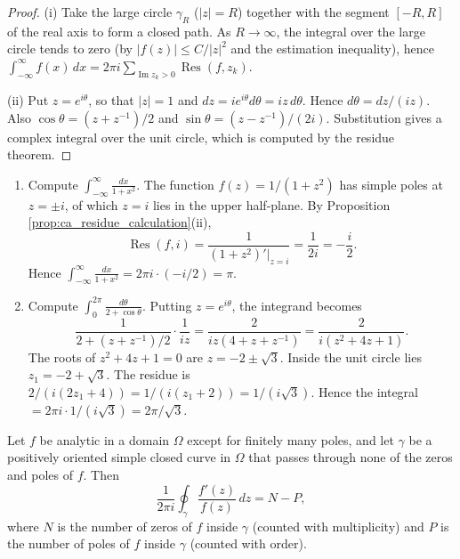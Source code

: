 \begin{proof}
(i) Take the large circle $\gamma_R$ ($|z| = R$) together with the segment $[-R, R]$ of the real axis to form a closed path. As $R \to \infty$, the integral over the large circle tends to zero (by $|f(z)| \le C/|z|^2$ and the estimation inequality), hence $\int_{-\infty}^{\infty} f(x) \, dx = 2\pi i \sum_{\operatorname{Im} z_k > 0} \operatorname{Res}(f, z_k)$.

(ii) Put $z = e^{i\theta}$, so that $|z| = 1$ and $dz = i e^{i\theta} d\theta = iz \, d\theta$. Hence $d\theta = dz/(iz)$. Also $\cos\theta = (z + z^{-1})/2$ and $\sin\theta = (z - z^{-1})/(2i)$. Substitution gives a complex integral over the unit circle, which is computed by the residue theorem.
\end{proof}

\begin{example}\label{ex:ca_residue_real_integral}
\begin{enumerate}[label=(\roman*)]
    \item Compute $\displaystyle\int_{-\infty}^{\infty} \frac{dx}{1 + x^2}$. The function $f(z) = 1/(1 + z^2)$ has simple poles at $z = \pm i$, of which $z = i$ lies in the upper half-plane. By Proposition \ref{prop:ca_residue_calculation}(ii),
    \[
    \operatorname{Res}(f, i) = \frac{1}{(1 + z^2)'|_{z=i}} = \frac{1}{2i} = -\frac{i}{2}.
    \]
    Hence $\int_{-\infty}^{\infty} \frac{dx}{1 + x^2} = 2\pi i \cdot (-i/2) = \pi$.
    \item Compute $\displaystyle\int_0^{2\pi} \frac{d\theta}{2 + \cos\theta}$. Putting $z = e^{i\theta}$, the integrand becomes
    \[
    \frac{1}{2 + (z + z^{-1})/2} \cdot \frac{1}{iz} = \frac{2}{iz(4 + z + z^{-1})} = \frac{2}{i(z^2 + 4z + 1)}.
    \]
    The roots of $z^2 + 4z + 1 = 0$ are $z = -2 \pm \sqrt{3}$. Inside the unit circle lies $z_1 = -2 + \sqrt{3}$. The residue is $2/(i(2z_1 + 4)) = 1/(i(z_1 + 2)) = 1/(i\sqrt{3})$. Hence the integral $= 2\pi i \cdot 1/(i\sqrt{3}) = 2\pi/\sqrt{3}$.
\end{enumerate}
\end{example}

\begin{theorem}\label{thm:ca_argument_principle}
Let $f$ be analytic in a domain $\Omega$ except for finitely many poles, and let $\gamma$ be a positively oriented simple closed curve in $\Omega$ that passes through none of the zeros and poles of $f$. Then
\[
\frac{1}{2\pi i} \oint_\gamma \frac{f'(z)}{f(z)} \, dz = N - P,
\]
where $N$ is the number of zeros of $f$ inside $\gamma$ (counted with multiplicity) and $P$ is the number of poles of $f$ inside $\gamma$ (counted with order).
\end{theorem}

